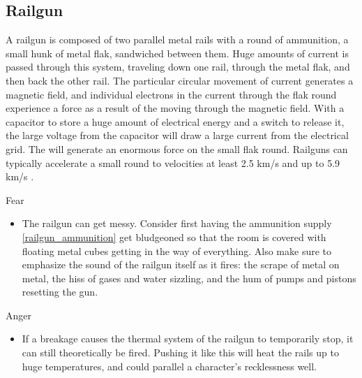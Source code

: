 \documentclass[a4paper]{article}
\begin{document}
\subsection{Railgun} \label{railgun}

A railgun is composed of two parallel metal rails with a round of ammunition, a small hunk of metal flak, sandwiched between them. Huge amounts of current is passed through this system, traveling down one rail, through the metal flak, and then back the other rail. The particular circular movement of current generates a magnetic field, and individual electrons in the current through the flak round experience a force as a result of the moving through the magnetic field. With a capacitor to store a huge amount of electrical energy and a switch to release it, the large voltage from the capacitor will draw a large current from the electrical grid. The will generate an enormous force on the small flak round. Railguns can typically accelerate a small round to velocities at least 2.5 km/s \cite{naval_railgun} and up to 5.9 km/s \cite{scientific_railgun}.

\vspace{0.3cm}
\begin{minipage}[t]{0.4\linewidth}
Fear
\begin{itemize}
\item The railgun can get messy. Consider first having the ammunition supply \ref{railgun_ammunition} get bludgeoned so that the room is covered with floating metal cubes getting in the way of everything. Also make sure to emphasize the sound of the railgun itself as it fires: the scrape of metal on metal, the hiss of gases and water sizzling, and the hum of pumps and pistons resetting the gun.
\end{itemize}
\end{minipage} 
\begin{minipage}[t]{0.4\linewidth}
Anger
\begin{itemize}
\item If a breakage causes the thermal system of the railgun to temporarily stop, it can still theoretically be fired. Pushing it like this will heat the rails up to huge temperatures, and could parallel a character's recklessness well.
\end{itemize}
\end{minipage}
\end{document}
